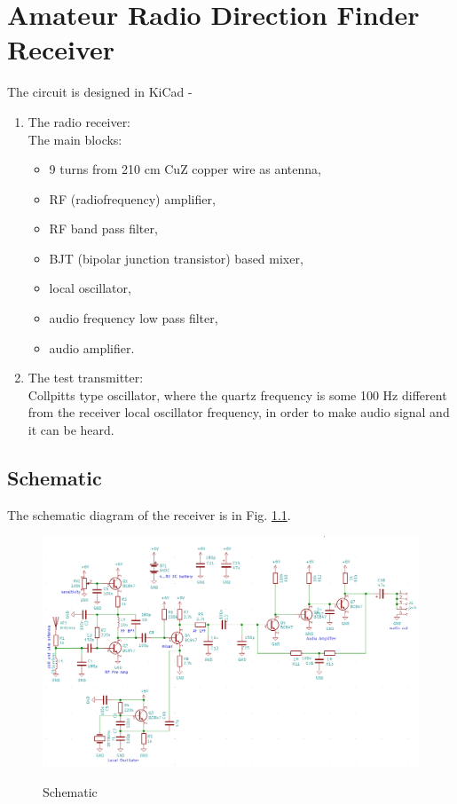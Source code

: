 \chapter{Amateur Radio Direction Finder Receiver}

The circuit is designed in KiCad - \cite{kicad}

\begin{enumerate}
\item
The radio receiver:\\
	The main blocks:
	\begin{itemize}
	\item 9 turns from 210 cm CuZ copper wire as antenna,
	\item RF (radiofrequency) amplifier,
	\item RF band pass filter,
	\item BJT (bipolar junction transistor) based mixer,
	\item local oscillator,
	\item audio frequency low pass filter,
	\item audio amplifier.
	\end{itemize}
\item
The test transmitter:\\
	Collpitts type oscillator, where the quartz frequency is some 100 Hz different from the receiver local oscillator frequency, in order to make audio signal and it can be heard.
\end{enumerate}

\newpage
\section{Schematic}

The schematic diagram of the receiver is in Fig. \ref{fig:rokasch}.

\begin{figure}[H]
\centering
\includegraphics[width=1\textwidth]{../pic/sch.png}\\
\caption{Schematic}
\label{fig:rokasch}
\end{figure}

